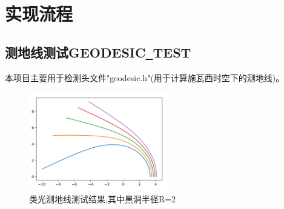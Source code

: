 \documentclass[a4paper, 12pt]{article}
\begin{document}
    \section{实现流程}
    \subsection{测地线测试GEODESIC\underline \ TEST}
    本项目主要用于检测头文件"geodesic.h"(用于计算施瓦西时空下的测地线)。
    \par 
    \begin{figure}[H]
        \centering
        \includegraphics[width=0.55\textwidth]{photo/geodesic_test.png}
        \caption{类光测地线测试结果,其中黑洞半径R=2}
    \end{figure}
    
    
\end{document}
